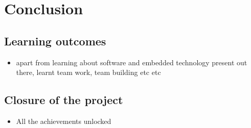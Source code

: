 \chapter{Conclusion} %

\label{ch:conc}


\section{Learning outcomes}
\begin{itemize}
    \item apart from learning about software and embedded technology present out there, learnt team work, team building etc etc
\end{itemize}

\section{Closure of the project}
\begin{itemize}
    \item All the achievements unlocked
\end{itemize}